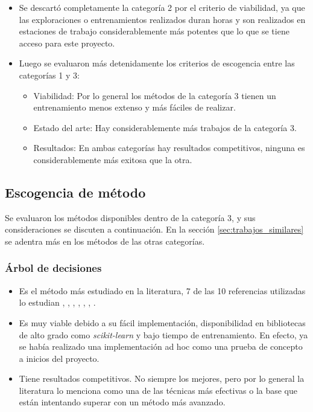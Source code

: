 \begin{itemize}
    \item Se descartó completamente la categoría 2 por el criterio de
      viabilidad, ya que las exploraciones o entrenamientos realizados duran
      horas y son realizados en estaciones de trabajo considerablemente más
      potentes que lo que se tiene acceso para este proyecto.
    \item Luego se evaluaron más detenidamente los criterios de escogencia entre
      las categorías 1 y 3:
    \begin{itemize}
        \item Viabilidad: Por lo general los métodos de la categoría 3 tienen
          un entrenamiento menos extenso y más fáciles de realizar.
        \item Estado del arte: Hay considerablemente más trabajos de la
          categoría 3.
        \item Resultados: En ambas categorías hay resultados competitivos,
          ninguna es considerablemente más exitosa que la otra.
    \end{itemize}
\end{itemize}

\subsection{Escogencia de método}

Se evaluaron los métodos disponibles dentro de la categoría 3, y sus
consideraciones se discuten a continuación. En la sección
\ref{sec:trabajos_similares} se adentra más en los métodos de las otras
categorías.

\subsubsection{Árbol de decisiones}

\begin{itemize}
    \item Es el método más estudiado en la literatura, 7 de las 10 referencias
      utilizadas lo estudian \cite{de_abreu_fast_2021},
      \cite{miyasaka_logic_2021}, \cite{rai_logic_2021},
      \cite{zeng_sampling-based_2021}, \cite{huang_circuit_2023},
      \cite{hu_optdtals_2024}, \cite{prats_ramos_impact_2024}.
    \item Es muy viable debido a su fácil implementación, disponibilidad en
      bibliotecas de alto grado como \emph{scikit-learn} y bajo tiempo de
      entrenamiento. En efecto, ya se había realizado una implementación ad hoc
      como una prueba de concepto a inicios del proyecto.
    \item Tiene resultados competitivos. No siempre los mejores, pero por lo
      general la literatura lo menciona como una de las técnicas más efectivas
      o la base que están intentando superar con un método más avanzado.
\end{itemize}

